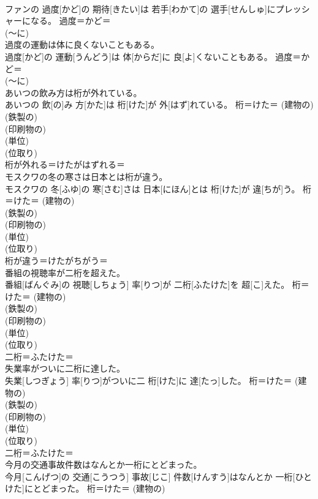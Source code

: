 \documentclass[8pt]{extreport}
\begin{document}
\begin{CJK}{UTF8}{min}
{\\	ファンの 過度[かど]の 期待[きたい]は 若手[わかて]の 選手[せんしゅ]にプレッシャーになる。	過度＝かど＝ 
\\	(〜に) 
\\	過度の運動は体に良くないこともある。	
\\	過度[かど]の 運動[うんどう]は 体[からだ]に 良[よ]くないこともある。	過度＝かど＝ 
\\	(〜に) 
\\	あいつの飲み方は桁が外れている。	
\\	あいつの 飲[の]み 方[かた]は 桁[けた]が 外[はず]れている。	桁＝けた＝ (建物の) 
\\	(鉄製の) 
\\	(印刷物の) 
\\	(単位) 
\\	(位取り) 
\\	桁が外れる＝けたがはずれる＝ 
\\	モスクワの冬の寒さは日本とは桁が違う。	
\\	モスクワの 冬[ふゆ]の 寒[さむ]さは 日本[にほん]とは 桁[けた]が 違[ちが]う。	桁＝けた＝ (建物の) 
\\	(鉄製の) 
\\	(印刷物の) 
\\	(単位) 
\\	(位取り) 
\\	桁が違う＝けたがちがう＝ 
\\	番組の視聴率が二桁を超えた。	
\\	番組[ばんぐみ]の 視聴[しちょう] 率[りつ]が 二桁[ふたけた]を 超[こ]えた。	桁＝けた＝ (建物の) 
\\	(鉄製の) 
\\	(印刷物の) 
\\	(単位) 
\\	(位取り) 
\\	二桁＝ふたけた＝ 
\\	失業率がついに二桁に達した。	
\\	失業[しつぎょう] 率[りつ]がついに二 桁[けた]に 達[たっ]した。	桁＝けた＝ (建物の) 
\\	(鉄製の) 
\\	(印刷物の) 
\\	(単位) 
\\	(位取り) 
\\	二桁＝ふたけた＝ 
\\	今月の交通事故件数はなんとか一桁にとどまった。	
\\	今月[こんげつ]の 交通[こうつう] 事故[じこ] 件数[けんすう]はなんとか 一桁[ひとけた]にとどまった。	桁＝けた＝ (建物の) 
}
\end{CJK}
\end{document}
